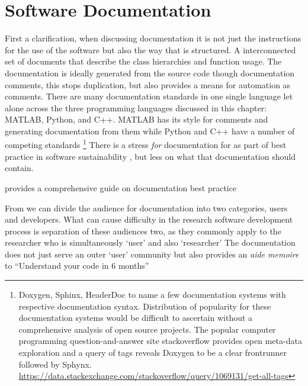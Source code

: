 \section{Software Documentation}
First a clarification, when discussing documentation it is not just the instructions for the use of the software but also the way that is structured. A interconnected set of documents that describe the class hierarchies and function usage.
The documentation is ideally generated from the source code though documentation comments, this stops duplication, but also provides a means for automation as comments.
There are many documentation standards in one single language let alone across the three programming languages discussed in this chapter: MATLAB, Python, and C\textsc{++}. 
MATLAB has its style for comments and generating documentation from them while Python \cite{vanrossum_pep8_2001,goodger_pep257_2001} and C++ have a number of competing standards
\footnote{Doxygen, Sphinx, HeaderDoc to name a few documentation systems with respective documentation syntax. Distribution of popularity for these documentation systems would be difficult to ascertain without a comprehensive analysis of open source projects. The popular computer programming question-and-answer site stackoverflow provides open meta-data exploration and a query of tags reveals Doxygen to be a clear frontrunner followed by Sphynx.\\\url{https://data.stackexchange.com/stackoverflow/query/1069131/get-all-tags}}
There is a stress \textit{for} documentation for as part of best practice in software sustainability \cite{smith_software_2016}, but less on what that documentation should contain. 


\textcite{writethedocs_sowftware_2025} provides a comprehensive guide on documentation best practice

From \textcite{writethedocs_sowftware_2025} we can divide the audience for documentation into two categories, users and developers. What can cause difficulty in the research software development process is separation of these audiences two, as they commonly apply to the researcher who is simultaneously `user' and also `researcher'
The documentation does not just serve an outer `user' community but also provides an \textit{aide memoire} to
``Understand your code in 6 months'' \cite{writethedocs_sowftware_2025} 

